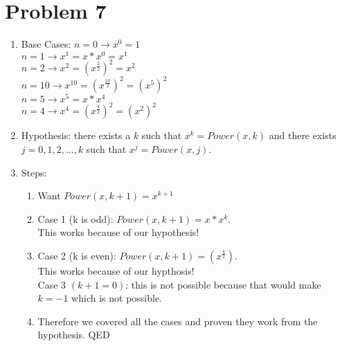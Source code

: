 \documentclass[11pt,letterpaper]{article}
\begin{document}
\newpage

\section*{Problem 7}
\begin{enumerate}
	\item[] Base Cases: $n = 0 \rightarrow x^0 = 1$
	\\ $n = 1 \rightarrow x^1 = x * x^0 = x^1$
	\\ $n = 2 \rightarrow x^2 = (x^{\frac{2}{2}})^2 = x^2$
	\\ $n = 10 \rightarrow x^{10} = (x^{\frac{10}{2}})^2 = (x^5)^2$
	\\ $n = 5 \rightarrow x^5 = x*x^4 $
	\\ $n = 4 \rightarrow x^4 = (x^{\frac{4}{2}})^2 = (x^2)^2$
	\item[] Hypothesis: there exists a $k$ such that $x^k = Power(x,k)$ and there exists $j = 0, 1, 2, ..., k$ such that $x^j = Power(x,j)$.
	\item[] Steps:
	\begin{enumerate}
		\item Want $Power(x,k+1) = x^{k+1}$
		\item Case 1 (k is odd): $Power(x, k+1) = x * x^k$.
		\\ This works because of our hypothesis!
		\item Case 2 (k is even): $Power(x, k+1) = (x^{\frac{k}{2}})$.
		\\ This works because of our hypthosis!
		\\ Case 3 $(k + 1 = 0)$: this is not possible because that would make $k = -1$ which is not possible.
		\item Therefore we covered all the cases and proven they work from the hypothesis. QED
	\end{enumerate}
\end{enumerate}

\newpage
\end{document}
